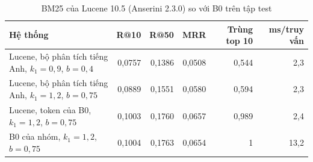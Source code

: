 \begin{table}[htbp]
\centering
\caption[BM25 của Lucene so với BM25 tự cài đặt]{BM25 của Lucene 10.5 (Anserini 2.3.0) so với B0 trên tập test }\label{tab:lucene}
\begin{tabularx}{\linewidth}{@{}>{\raggedright\arraybackslash}Xrrrrr@{}}
\toprule
Hệ thống & R@10 & R@50 & MRR & Trùng top 10 & ms/truy vấn \\
\midrule
Lucene, bộ phân tích tiếng Anh, $k_1 = 0{,}9$, $b = 0{,}4$ & 0,0757 & 0,1386 & 0,0508 & 0,544 & 2,3 \\
Lucene, bộ phân tích tiếng Anh, $k_1 = 1{,}2$, $b = 0{,}75$ & 0,0889 & 0,1551 & 0,0580 & 0,594 & 2,3 \\
Lucene, token của B0, $k_1 = 1{,}2$, $b = 0{,}75$ & 0,1003 & 0,1760 & 0,0657 & 0,989 & 2,4 \\
B0 của nhóm, $k_1 = 1{,}2$, $b = 0{,}75$ & 0,1004 & 0,1763 & 0,0654 & 1 & 13,2 \\
\bottomrule
\end{tabularx}
\par{}
\end{table}
